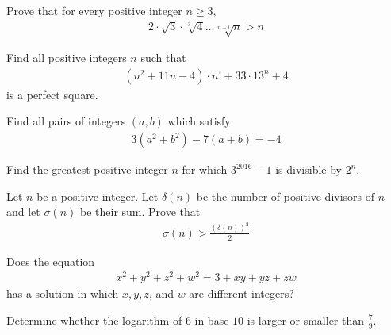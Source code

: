 \begin{problem}
	Prove that for every positive integer $n \geq 3$,
	\begin{align*}
		2 \cdot \sqrt 3 \cdot \sqrt[3]{4} \dots \sqrt[n-1]{n} >n
	\end{align*}
\end{problem}

\begin{problem}
	Find all positive integers $n$ such that
	\begin{align*}
		\left(n^2+11n-4\right)\cdot n! + 33 \cdot 13^n + 4
	\end{align*}
	is a perfect square.
\end{problem}

\begin{problem}
	Find all pairs of integers $(a, b)$ which satisfy
	\begin{align*}
		3 (a^2 + b^2 ) - 7 (a + b) = -4
	\end{align*}
\end{problem}

\begin{problem}
	Find the greatest positive integer $n$ for which $3^{2016} - 1$ is divisible by $2^n$.
\end{problem}

\begin{problem}
	Let $n$ be a positive integer. Let $\delta(n)$ be the number of positive divisors of $n$ and let $\sigma(n)$ be their sum. Prove that
	\begin{align*}
		\sigma(n) > \frac{\left(\delta(n)\right)^2}{2}
	\end{align*}
\end{problem}

\begin{problem}
	Does the equation
	\begin{align*}
		x^2+y^2+z^2+w^2=3 + xy + yz + zw
	\end{align*}
	has a solution in which $x, y, z$, and $w$ are different integers?
\end{problem}

\begin{problem}
	Determine whether the logarithm of $6$ in base $10$ is larger or smaller than $\displaystyle\frac{7}{9}$.
\end{problem}

